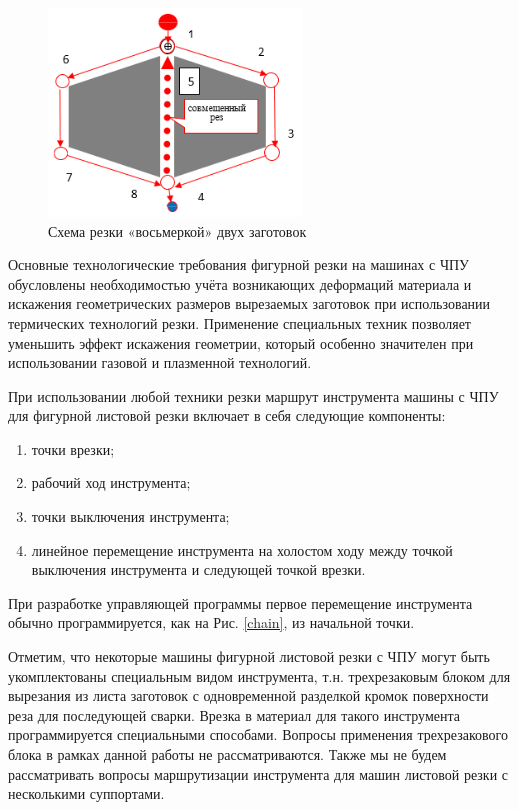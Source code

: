\documentclass[12pt]{report}
\begin{document}
\begin{figure}
  \begin{center}
  \includegraphics[width=0.6\textwidth]{8.png}
  \caption{Схема резки «восьмеркой» двух заготовок}
  \label{8}
  \end{center}
\end{figure}

Основные технологические требования
фигурной резки на машинах с ЧПУ обусловлены
необходимостью учёта возникающих деформаций
материала и искажения геометрических размеров
вырезаемых заготовок при использовании
термических технологий резки.
Применение специальных техник позволяет
уменьшить эффект искажения геометрии,
который особенно значителен при
использовании газовой и плазменной технологий.

При использовании любой техники резки маршрут инструмента
машины с ЧПУ для фигурной листовой резки
включает в себя следующие компоненты:
\begin{enumerate}
  \item точки врезки;
  \item рабочий ход инструмента;
  \item точки выключения инструмента;
  \item линейное перемещение инструмента на холостом ходу
  между точкой выключения инструмента и следующей точкой врезки.
\end{enumerate}

При разработке управляющей программы
первое перемещение инструмента обычно
программируется, как на Рис. \ref{chain},
из начальной точки.

Отметим, что некоторые машины фигурной листовой
резки с ЧПУ могут быть укомплектованы
специальным видом инструмента,
т.н. трехрезаковым блоком для вырезания
из листа заготовок с одновременной разделкой
кромок поверхности реза для последующей сварки.
Врезка в материал для такого инструмента
программируется специальными способами.
Вопросы применения трехрезакового блока
в рамках данной работы не рассматриваются.
Также мы не будем рассматривать вопросы
маршрутизации инструмента для машин
листовой резки с несколькими суппортами.
\end{document}
